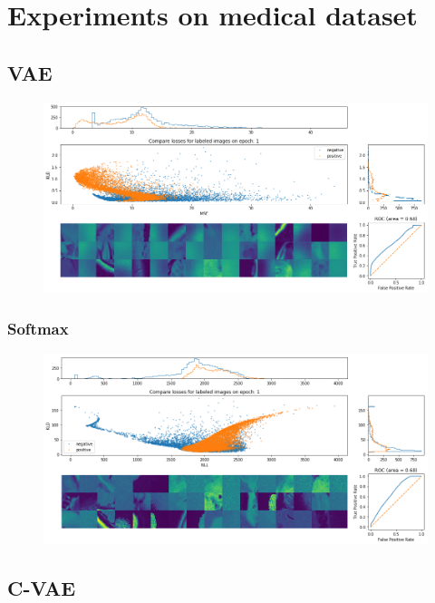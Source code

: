 \chapter{Experiments on medical dataset}

\section{VAE}

\begin{figure}[h!]
    \centering
    \includegraphics[width=1.0\textwidth]{images/vae_1}
    \caption{}
    \label{fig:vae_1}
\end{figure}

\subsection{Softmax}

\begin{figure}[h!]
    \centering
    \includegraphics[width=1.0\textwidth]{images/soft_vae}
    \caption{}
    \label{fig:soft_vae}
\end{figure}

\section{C-VAE} 

